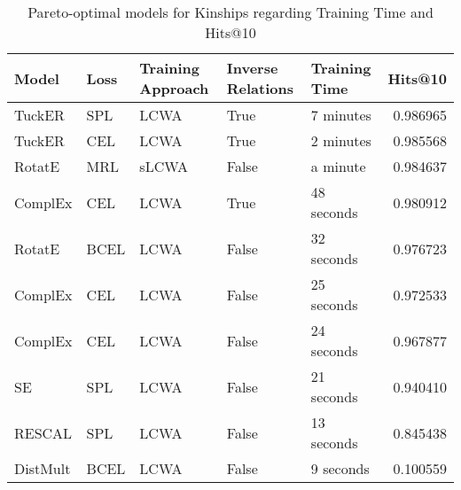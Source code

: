 \begin{table}
\centering
\caption{Pareto-optimal models for Kinships regarding Training Time and Hits@10}
\begin{tabular}{lllllr}
\toprule
    Model &  Loss & Training Approach & Inverse Relations & Training Time &   Hits@10 \\
\midrule
   TuckER &   SPL &              LCWA &              True &     7 minutes &  0.986965 \\
   TuckER &   CEL &              LCWA &              True &     2 minutes &  0.985568 \\
   RotatE &   MRL &             sLCWA &             False &      a minute &  0.984637 \\
  ComplEx &   CEL &              LCWA &              True &    48 seconds &  0.980912 \\
   RotatE &  BCEL &              LCWA &             False &    32 seconds &  0.976723 \\
  ComplEx &   CEL &              LCWA &             False &    25 seconds &  0.972533 \\
  ComplEx &   CEL &              LCWA &             False &    24 seconds &  0.967877 \\
       SE &   SPL &              LCWA &             False &    21 seconds &  0.940410 \\
   RESCAL &   SPL &              LCWA &             False &    13 seconds &  0.845438 \\
 DistMult &  BCEL &              LCWA &             False &     9 seconds &  0.100559 \\
\bottomrule
\end{tabular}
\end{table}

